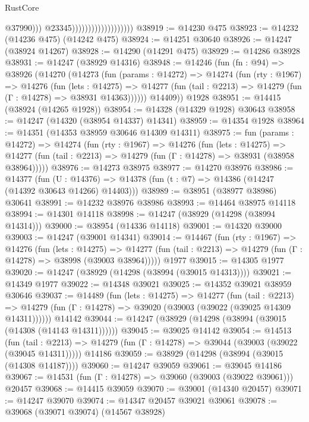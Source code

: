 \begin{lexlean}{RustCore}
\begin{coremodule}
                                                @37990)))
                                          @23345)))))))))))))))))))
@38919 := @14230 @475
@38923 := @14232 (@14236 @475) (@14242 @475)
@38924 := @14251 @30640
@38926 := @14247 (@38924 @14267)
@38928 := @14290 (@14291 @475)
@38929 := @14286 @38928
@38931 := @14247 (@38929 @14316)
@38948 := @14246
    (fun (fn : @94) =>
    @38926
      (@14270
        (@14273
          (fun (params : @14272) =>
          @14274
            (fun (rty : @1967) =>
            @14276
              (fun (lets : @14275) =>
              @14277 (fun (tail : @2213) => @14279 (fun (Γ : @14278) => @38931 @14363))))))
        @14409))
    @1928
@38951 := @14415 (@38924 (@14265 @1928))
@38954 := @14328 (@14329 @1928) @30643
@38958 := @14247 (@14320 (@38954 @14337) @14341)
@38959 := @14354 @1928
@38964 := @14351 (@14353 @38959 @30646 @14309 @14311)
@38975 := fun (params : @14272) =>
  @14274
    (fun (rty : @1967) =>
    @14276
      (fun (lets : @14275) =>
      @14277 (fun (tail : @2213) => @14279 (fun (Γ : @14278) => @38931 (@38958 @38964)))))
@38976 := @14273 @38975
@38977 := @14270 @38976
@38986 := @14377
    (fun (U : @14376) => @14378 (fun (t : @7) => @14386 (@14247 (@14392 @30643 @14266) @14403)))
@38989 := @38951 (@38977 @38986) @30641
@38991 := @14232 @38976 @38986
@38993 := @14464 @38975 @14118
@38994 := @14301 @14118
@38998 := @14247 (@38929 (@14298 (@38994 @14314)))
@39000 := @38954 (@14336 @14118)
@39001 := @14320 @39000
@39003 := @14247 (@39001 @14341)
@39014 := @14467
    (fun (rty : @1967) =>
    @14276
      (fun (lets : @14275) =>
      @14277 (fun (tail : @2213) => @14279 (fun (Γ : @14278) => @38998 (@39003 @38964)))))
    @1977
@39015 := @14305 @1977
@39020 := @14247 (@38929 (@14298 (@38994 (@39015 @14313))))
@39021 := @14349 @1977
@39022 := @14348 @39021
@39025 := @14352 @39021 @38959 @30646
@39037 := @14489
    (fun (lets : @14275) =>
    @14277
      (fun (tail : @2213) =>
      @14279 (fun (Γ : @14278) => @39020 (@39003 (@39022 (@39025 @14309 @14311))))))
    @14142
@39044 := @14247 (@38929 (@14298 (@38994 (@39015 (@14308 (@14143 @14311))))))
@39045 := @39025 @14142
@39054 := @14513
    (fun (tail : @2213) => @14279 (fun (Γ : @14278) => @39044 (@39003 (@39022 (@39045 @14311)))))
    @14186
@39059 := @38929 (@14298 (@38994 (@39015 (@14308 @14187))))
@39060 := @14247 @39059
@39061 := @39045 @14186
@39067 := @14531 (fun (Γ : @14278) => @39060 (@39003 (@39022 @39061))) @20457
@39068 := @14415 @39059
@39070 := @39001 (@14340 @20457)
@39071 := @14247 @39070
@39074 := @14347 @20457 @39021 @39061
@39078 := @39068 (@39071 @39074) (@14567 @38928)

\end{coremodule}
\end{lexlean}
